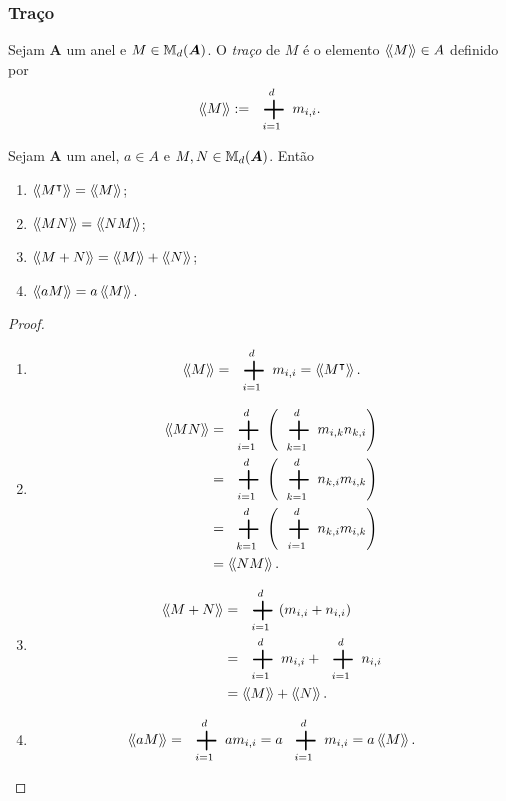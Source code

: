 \subsubsection{Traço}

\begin{definition}
	Sejam $\bm A$ um anel e $M \in \mathbb{M}_d(\bm A)$. O \emph{traço} de $M$ é o elemento $\left\langle\!\left\langle{M}\right\rangle\!\right\rangle \in A$ definido por
	\begin{equation*}
	\tr{M} := \sum_{i=1}^d m_{i,i}.
	\end{equation*}
\end{definition}

\begin{proposition}
	Sejam $\bm A$ um anel, $a \in A$ e $M,N \in \mathbb{M}_d(\bm A)$. Então
	\begin{enumerate}
	\item $\left\langle\!\left\langle{M^\intercal}\right\rangle\!\right\rangle=\left\langle\!\left\langle{M}\right\rangle\!\right\rangle$;
	\item $\left\langle\!\left\langle{MN}\right\rangle\!\right\rangle=\left\langle\!\left\langle{NM}\right\rangle\!\right\rangle$;
	\item $\left\langle\!\left\langle{M+N}\right\rangle\!\right\rangle=\left\langle\!\left\langle{M}\right\rangle\!\right\rangle+\left\langle\!\left\langle{N}\right\rangle\!\right\rangle$;
	\item $\left\langle\!\left\langle{aM}\right\rangle\!\right\rangle=a\left\langle\!\left\langle{M}\right\rangle\!\right\rangle$.
	\end{enumerate}
\end{proposition}
\begin{proof}
	\begin{enumerate}
	\item
		\begin{equation*}
		\tr{M} = \sum_{i=1}^d m_{i,i} = \tr{M^\intercal}.
		\end{equation*}
	\item
		\begin{align*}
		\tr{MN} &= \sum_{i=1}^d \left(\sum_{k=1}^d m_{i,k}n_{k,i}\right) \\
		&= \sum_{i=1}^d \left(\sum_{k=1}^d n_{k,i}m_{i,k}\right) \\
		&= \sum_{k=1}^d \left(\sum_{i=1}^d n_{k,i}m_{i,k}\right) \\
		&= \tr{NM}.
		\end{align*}
	\item
		\begin{align*}
		\tr{M+N} &= \sum_{i=1}^d (m_{i,i} + n_{i,i}) \\
		&= \sum_{i=1}^d m_{i,i} + \sum_{i=1}^d n_{i,i} \\
		&= \tr{M} + \tr{N}.
		\end{align*}
	\item
		\begin{equation*}
		\tr{aM} = \sum_{i=1}^d am_{i,i} = a\sum_{i=1}^d m_{i,i} = a\tr{M}.
		\end{equation*}
\qedhere
	\end{enumerate}
\end{proof}



